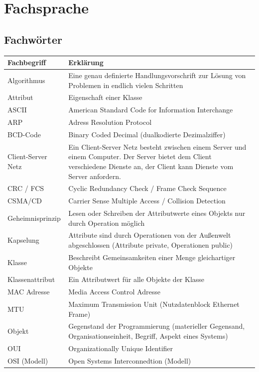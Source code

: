 \documentclass[12pt,a4paper]{article}
\begin{document}
\section{Fachsprache}

\subsection{Fachwörter}
    \begin{table}[h]
        \renewcommand{\arraystretch}{2}
        \begin{tabularx}{17cm}{|l|X|}
            \hline
            Fachbegriff&Erklärung\\
            \hline
            \hline
            Algorithmus&Eine genau definierte Handlungsvorschrift zur Lösung von Problemen in endlich vielen Schritten\\
            \hline
            Attribut&Eigenschaft einer Klasse\\
            \hline
            ASCII&American Standard Code for Information Interchange\\
            \hline
            ARP&Adress Resolution Protocol\\
            \hline
            BCD-Code&Binary Coded Decimal (dualkodierte Dezimalziffer)\\
            \hline
            Client-Server Netz&Ein Client-Server Netz besteht zwischen einem Server und einem Computer. Der Server bietet dem Client verschiedene Dienste an, der Client kann Dienste vom Server anfordern.\\
            \hline
            CRC / FCS& Cyclic Redundancy Check / Frame Check Sequence\\
            \hline
            CSMA/CD&Carrier Sense Multiple Access / Collision Detection\\
            \hline
            Geheimnisprinzip&Lesen oder Schreiben der Attributwerte eines Objekts nur durch Operation möglich\\
            \hline
            Kapselung&Attribute sind durch Operationen von der Außenwelt abgeschlossen (Attribute private, Operationen public)\\
            \hline
            Klasse&Beschreibt Gemeinsamkeiten einer Menge gleichartiger Objekte\\
            \hline
            Klassenattribut&Ein Attributwert für alle Objekte der Klasse\\
            \hline
            MAC Adresse& Media Access Control Adresse\\
            \hline
            MTU&Maximum Transmission Unit (Nutzdatenblock Ethernet Frame)\\
            \hline
            Objekt&Gegenstand der Programmierung (materieller Gegensand, Organisationseinheit, Begriff, Aspekt eines Systems)\\
            \hline
            OUI&Organizationally Unique Identifier\\
            \hline
            OSI (Modell)&Open Systems Interconnedtion (Modell)\\
            \hline
        \end{tabularx}
    \end{table}
\end{document}

